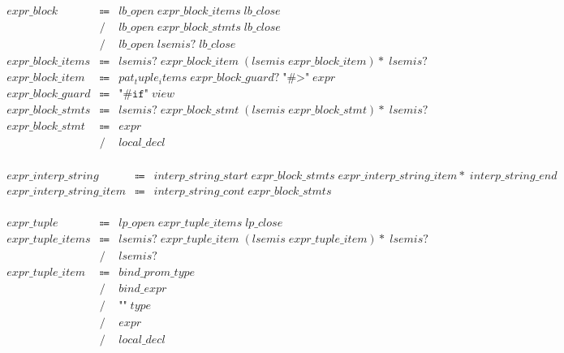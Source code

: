 \begin{align*}
    \begin{array}{rcll}
        \mathit{expr\_block}
        &\Coloneq &\mathit{lb\_open}\; \mathit{expr\_block\_items}\; \mathit{lb\_close} \\
        &\mathrel{/} &\mathit{lb\_open}\; \mathit{expr\_block\_stmts}\; \mathit{lb\_close} \\
        &\mathrel{/} &\mathit{lb\_open}\; \mathit{lsemis}{?}\; \mathit{lb\_close} \\
        \mathit{expr\_block\_items}
        &\Coloneq &\mathit{lsemis}{?}\; \mathit{expr\_block\_item}\; (\mathit{lsemis}\; \mathit{expr\_block\_item}){*}\; \mathit{lsemis}{?} \\
        \mathit{expr\_block\_item}
        &\Coloneq &\mathit{pat_tuple_items}\; \mathit{expr\_block\_guard}{?}\; \texttt{"\#>"}\; \mathit{expr} \\
        \mathit{expr\_block\_guard}
        &\Coloneq &\texttt{"\#if"}\; \mathit{view} \\
        \mathit{expr\_block\_stmts}
        &\Coloneq &\mathit{lsemis}{?}\; \mathit{expr\_block\_stmt}\; (\mathit{lsemis}\; \mathit{expr\_block\_stmt}){*}\; \mathit{lsemis}{?} \\
        \mathit{expr\_block\_stmt}
        &\Coloneq &\mathit{expr} \\
        &\mathrel{/} &\mathit{local\_decl}
    \end{array}
\end{align*}

\begin{align*}
    \begin{array}{rcll}
        \mathit{expr\_interp\_string}
        &\Coloneq &\mathit{interp\_string\_start}\; \mathit{expr\_block\_stmts}\; \mathit{expr\_interp\_string\_item}{*}\; \mathit{interp\_string\_end} \\
        \mathit{expr\_interp\_string\_item}
        &\Coloneq &\mathit{interp\_string\_cont}\; \mathit{expr\_block\_stmts}
    \end{array}
\end{align*}

\begin{align*}
    \begin{array}{rcll}
        \mathit{expr\_tuple}
        &\Coloneq &\mathit{lp\_open}\; \mathit{expr\_tuple\_items}\; \mathit{lp\_close} \\
        \mathit{expr\_tuple\_items}
        &\Coloneq &\mathit{lsemis}{?}\; \mathit{expr\_tuple\_item}\; (\mathit{lsemis}\; \mathit{expr\_tuple\_item}){*}\; \mathit{lsemis}{?} \\
        &\mathrel{/} &\mathit{lsemis}{?} \\
        \mathit{expr\_tuple\_item}
        &\Coloneq &\mathit{bind\_prom\_type} \\
        &\mathrel{/} &\mathit{bind\_expr} \\
        &\mathrel{/} &\texttt{"\^{}"}\; \mathit{type} \\
        &\mathrel{/} &\mathit{expr} \\
        &\mathrel{/} &\mathit{local\_decl}
    \end{array}
\end{align*}

